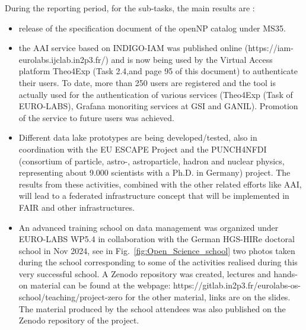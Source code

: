 During the reporting period, for the sub-tasks, the main results are :
\begin{itemize}
    \item  release of the specification document of the openNP catalog under MS35.
    \item the AAI service based on INDIGO-IAM was published online (https://iam-eurolabs.ijclab.in2p3.fr/) and is now being used by the Virtual Access platform Theo4Exp (Task 2.4,{and page 95 of this document}) to authenticate their users. To date, more than 250 users are registered and the tool is actually used for the authentication of various services (Theo4Exp (Task of EURO-LABS), Grafana monoriting services at GSI and GANIL). Promotion of the service to future users was achieved.
    \item Different data lake prototypes are being developed/tested, also in coordination with the EU ESCAPE Project and the PUNCH4NFDI (consortium of particle, astro-, astroparticle, hadron and nuclear physics, representing about 9.000 scientists with a Ph.D. in Germany) project. The results from these activities, combined with the other related efforts like AAI, will lead to a federated infrastructure concept that will be implemented in FAIR and other infrastructures.
    \item An advanced training school on data management was organized under EURO-LABS WP5.4 in collaboration with the German HGS-HIRe doctoral school in Nov 2024, see in Fig.~\ref{fig:Open_Science_school}    
   two photos taken during the school corresponding to some of the activities realised during this very successful school.  A Zenodo repository was created, lectures and hands-on material can be found at the webpage: https://gitlab.in2p3.fr/eurolabs-os-school/teaching/project-zero for the other material, links are on the slides. The material produced by the school attendees was also published on the Zenodo repository of the project.
\end{itemize}

